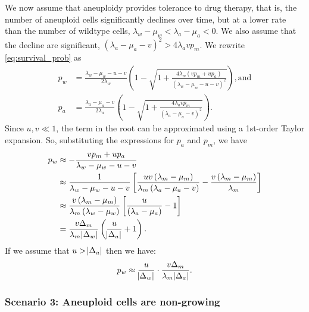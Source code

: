 \documentclass[12pt]{extarticle}
\begin{document}
\begin{appendices}
We now assume that aneuploidy provides tolerance to drug therapy, that is, the number of aneuploid cells significantly declines over time, but at a lower rate than the number of wildtype cells, $\lambda_w - \mu_w < \lambda_a - \mu_a < 0$. We also assume that the decline are significant, $\left(\lambda_a-\mu_a-v\right)^2 > 4\lambda_a v p_m$.
We rewrite \cref{eq:survival_prob} as
\begin{equation}
\begin{aligned}
p_w&=\frac{\lambda_w-\mu_w-u-v}{2\lambda_w}\left(1-\sqrt{1+\frac{4\lambda_w\left(vp_m+up_a\right)}{\left(\lambda_w-\mu_w-u-v\right)^2}}\right) ,
\text{and} \\
p_a&=\frac{\lambda_a-\mu_a-v}{2\lambda_a}\left(1-\sqrt{1+\frac{4\lambda_avp_m}{\left(\lambda_a-\mu_a-v\right)^2}}\right) .
\end{aligned}
\end{equation}
Since $u,v\ll1$, the term in the root can be approximated using a 1st-order Taylor expansion. So, substituting the expressions for $p_a$ and $p_m$, we have
\begin{equation} \label{eq:survprobwinitial}
\begin{aligned}
p_w&\approx-\frac{vp_m+up_a}{\lambda_w-\mu_w-u-v}\\
&\approx\frac{1}{\lambda_w-\mu_w-u-v}\left[\frac{uv\left(\lambda_m-\mu_m\right)}{\lambda_m\left(\lambda_a-\mu_a-v\right)}-\frac{v\left(\lambda_m-\mu_m\right)}{\lambda_m}\right]\\ %
&\approx\frac{v\left(\lambda_m-\mu_m\right)}{\lambda_m\left(\lambda_w-\mu_w\right)}\left[\frac{u}{\left(\lambda_a-\mu_a\right)}-1\right] \\
&=\frac{v\Delta_m}{\lambda_m \abs{\Delta_w}}\left(\frac{u}{\abs{\Delta_a}}+1\right) .
\end{aligned}
\end{equation}
If we assume that $u>\abs{\Delta_a}$ then we have:
\begin{equation*}
p_w\approx\frac{u}{\abs{\Delta_w}}\cdot\frac{v\Delta_m}{\lambda_m \abs{\Delta_a}}.
\end{equation*}

\subsubsection*{Scenario 3: Aneuploid cells are non-growing} %


\end{appendices}
\end{document}
